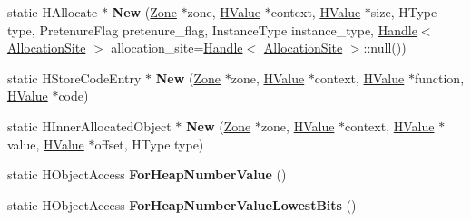 \begin{DoxyCompactItemize}
\item 
\hypertarget{classv8_1_1internal_1_1_v8___f_i_n_a_l_a77622df7a5c38eb5e947fe67c9ed7916}{}static H\+Allocate $\ast$ {\bfseries New} (\hyperlink{classv8_1_1internal_1_1_zone}{Zone} $\ast$zone, \hyperlink{classv8_1_1internal_1_1_h_value}{H\+Value} $\ast$context, \hyperlink{classv8_1_1internal_1_1_h_value}{H\+Value} $\ast$size, H\+Type type, Pretenure\+Flag pretenure\+\_\+flag, Instance\+Type instance\+\_\+type, \hyperlink{classv8_1_1internal_1_1_handle}{Handle}$<$ \hyperlink{classv8_1_1internal_1_1_allocation_site}{Allocation\+Site} $>$ allocation\+\_\+site=\hyperlink{classv8_1_1internal_1_1_handle}{Handle}$<$ \hyperlink{classv8_1_1internal_1_1_allocation_site}{Allocation\+Site} $>$\+::null())\label{classv8_1_1internal_1_1_v8___f_i_n_a_l_a77622df7a5c38eb5e947fe67c9ed7916}

\item 
\hypertarget{classv8_1_1internal_1_1_v8___f_i_n_a_l_a582d91bc7bdcf26aaa646c112635161e}{}static H\+Store\+Code\+Entry $\ast$ {\bfseries New} (\hyperlink{classv8_1_1internal_1_1_zone}{Zone} $\ast$zone, \hyperlink{classv8_1_1internal_1_1_h_value}{H\+Value} $\ast$context, \hyperlink{classv8_1_1internal_1_1_h_value}{H\+Value} $\ast$function, \hyperlink{classv8_1_1internal_1_1_h_value}{H\+Value} $\ast$code)\label{classv8_1_1internal_1_1_v8___f_i_n_a_l_a582d91bc7bdcf26aaa646c112635161e}

\item 
\hypertarget{classv8_1_1internal_1_1_v8___f_i_n_a_l_a6380b9d19722a617734beedc445ec706}{}static H\+Inner\+Allocated\+Object $\ast$ {\bfseries New} (\hyperlink{classv8_1_1internal_1_1_zone}{Zone} $\ast$zone, \hyperlink{classv8_1_1internal_1_1_h_value}{H\+Value} $\ast$context, \hyperlink{classv8_1_1internal_1_1_h_value}{H\+Value} $\ast$value, \hyperlink{classv8_1_1internal_1_1_h_value}{H\+Value} $\ast$offset, H\+Type type)\label{classv8_1_1internal_1_1_v8___f_i_n_a_l_a6380b9d19722a617734beedc445ec706}

\item 
\hypertarget{classv8_1_1internal_1_1_v8___f_i_n_a_l_a22043ff40fdecc13ee926c31d09d1327}{}static H\+Object\+Access {\bfseries For\+Heap\+Number\+Value} ()\label{classv8_1_1internal_1_1_v8___f_i_n_a_l_a22043ff40fdecc13ee926c31d09d1327}

\item 
\hypertarget{classv8_1_1internal_1_1_v8___f_i_n_a_l_a920f821f0013be50fba8dc064d608b88}{}static H\+Object\+Access {\bfseries For\+Heap\+Number\+Value\+Lowest\+Bits} ()\label{classv8_1_1internal_1_1_v8___f_i_n_a_l_a920f821f0013be50fba8dc064d608b88}


\end{DoxyCompactItemize}

